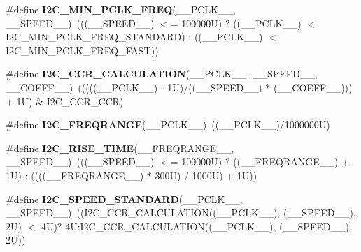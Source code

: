 \begin{DoxyCompactItemize}
\item 
\mbox{\label{group___i2_c___private___macros_ga30bf3d43ca9c1d9eb665bda03d84ec4a}} 
\#define {\bfseries I2\+C\+\_\+\+M\+I\+N\+\_\+\+P\+C\+L\+K\+\_\+\+F\+R\+EQ}(\+\_\+\+\_\+\+P\+C\+L\+K\+\_\+\+\_\+,  \+\_\+\+\_\+\+S\+P\+E\+E\+D\+\_\+\+\_\+)~(((\+\_\+\+\_\+\+S\+P\+E\+E\+D\+\_\+\+\_\+) $<$= 100000\+U) ? ((\+\_\+\+\_\+\+P\+C\+L\+K\+\_\+\+\_\+) $<$ I2\+C\+\_\+\+M\+I\+N\+\_\+\+P\+C\+L\+K\+\_\+\+F\+R\+E\+Q\+\_\+\+S\+T\+A\+N\+D\+A\+R\+D) \+: ((\+\_\+\+\_\+\+P\+C\+L\+K\+\_\+\+\_\+) $<$ I2\+C\+\_\+\+M\+I\+N\+\_\+\+P\+C\+L\+K\+\_\+\+F\+R\+E\+Q\+\_\+\+F\+A\+S\+T))
\item 
\mbox{\label{group___i2_c___private___macros_ga647da9b3c71c56e2e1b49417bc557233}} 
\#define {\bfseries I2\+C\+\_\+\+C\+C\+R\+\_\+\+C\+A\+L\+C\+U\+L\+A\+T\+I\+ON}(\+\_\+\+\_\+\+P\+C\+L\+K\+\_\+\+\_\+,  \+\_\+\+\_\+\+S\+P\+E\+E\+D\+\_\+\+\_\+,  \+\_\+\+\_\+\+C\+O\+E\+F\+F\+\_\+\+\_\+)~(((((\+\_\+\+\_\+\+P\+C\+L\+K\+\_\+\+\_\+) -\/ 1\+U)/((\+\_\+\+\_\+\+S\+P\+E\+E\+D\+\_\+\+\_\+) $\ast$ (\+\_\+\+\_\+\+C\+O\+E\+F\+F\+\_\+\+\_\+))) + 1\+U) \& I2\+C\+\_\+\+C\+C\+R\+\_\+\+C\+C\+R)
\item 
\mbox{\label{group___i2_c___private___macros_ga9b4e4686872c7b0bd9daed9049d0c431}} 
\#define {\bfseries I2\+C\+\_\+\+F\+R\+E\+Q\+R\+A\+N\+GE}(\+\_\+\+\_\+\+P\+C\+L\+K\+\_\+\+\_\+)~((\+\_\+\+\_\+\+P\+C\+L\+K\+\_\+\+\_\+)/1000000\+U)
\item 
\mbox{\label{group___i2_c___private___macros_ga27cae7b1432cd160ab708e1548ba3165}} 
\#define {\bfseries I2\+C\+\_\+\+R\+I\+S\+E\+\_\+\+T\+I\+ME}(\+\_\+\+\_\+\+F\+R\+E\+Q\+R\+A\+N\+G\+E\+\_\+\+\_\+,  \+\_\+\+\_\+\+S\+P\+E\+E\+D\+\_\+\+\_\+)~(((\+\_\+\+\_\+\+S\+P\+E\+E\+D\+\_\+\+\_\+) $<$= 100000\+U) ? ((\+\_\+\+\_\+\+F\+R\+E\+Q\+R\+A\+N\+G\+E\+\_\+\+\_\+) + 1\+U) \+: ((((\+\_\+\+\_\+\+F\+R\+E\+Q\+R\+A\+N\+G\+E\+\_\+\+\_\+) $\ast$ 300\+U) / 1000\+U) + 1\+U))
\item 
\mbox{\label{group___i2_c___private___macros_gaa71590c93b126e79fc86afbc819742b3}} 
\#define {\bfseries I2\+C\+\_\+\+S\+P\+E\+E\+D\+\_\+\+S\+T\+A\+N\+D\+A\+RD}(\+\_\+\+\_\+\+P\+C\+L\+K\+\_\+\+\_\+,  \+\_\+\+\_\+\+S\+P\+E\+E\+D\+\_\+\+\_\+)~((I2\+C\+\_\+\+C\+C\+R\+\_\+\+C\+A\+L\+C\+U\+L\+A\+T\+I\+ON((\+\_\+\+\_\+\+P\+C\+L\+K\+\_\+\+\_\+), (\+\_\+\+\_\+\+S\+P\+E\+E\+D\+\_\+\+\_\+), 2\+U) $<$ 4\+U)? 4\+U\+:\+I2\+C\+\_\+\+C\+C\+R\+\_\+\+C\+A\+L\+C\+U\+L\+A\+T\+I\+O\+N((\+\_\+\+\_\+\+P\+C\+L\+K\+\_\+\+\_\+), (\+\_\+\+\_\+\+S\+P\+E\+E\+D\+\_\+\+\_\+), 2\+U))

\end{DoxyCompactItemize}
